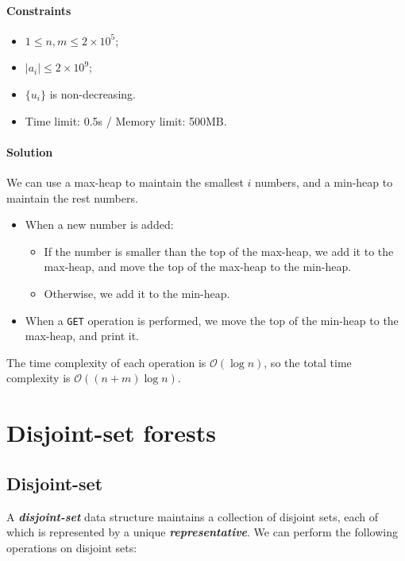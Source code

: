 \documentclass[12pt,a4paper]{ctexart}
\newcommand{\highlight}[1]{\textbf{\textit{#1}}}
\renewcommand{\leq}{\leqslant}
\begin{document}
    \paragraph{Constraints}

    \begin{itemize}
        \item $1\leq n,m\leq 2\times 10^5$;
        \item $|a_i|\leq 2\times 10^9$;
        \item $\{u_i\}$ is non-decreasing.
        \item Time limit: 0.5s / Memory limit: 500MB.
    \end{itemize}

    \paragraph{Solution}

    We can use a max-heap to maintain the smallest $i$ numbers, and a min-heap to maintain the rest numbers.
    
    \begin{itemize}
        \item When a new number is added:
        \begin{itemize}[left=1em]
            \item If the number is smaller than the top of the max-heap, we add it to the max-heap, and move the top of the max-heap to the min-heap.
            \item Otherwise, we add it to the min-heap.
        \end{itemize}
        \item When a \texttt{GET} operation is performed, we move the top of the min-heap to the max-heap, and print it.
    \end{itemize}

    The time complexity of each operation is $\mathcal O(\log n)$, so the total time complexity is $\mathcal O((n+m)\log n)$.

    \section{Disjoint-set forests}

    \subsection{Disjoint-set}

    A \highlight{disjoint-set} data structure maintains a collection of disjoint sets, each of which is represented by a unique \highlight{representative}. We can perform the following operations on disjoint sets:
\end{document}
